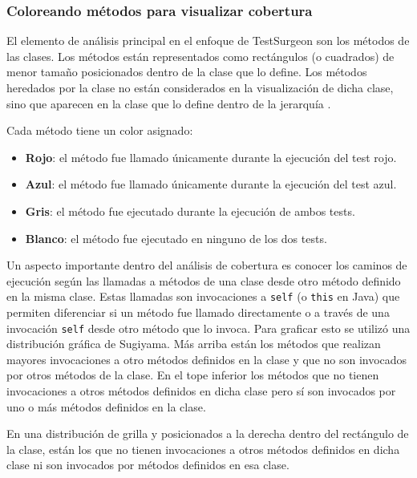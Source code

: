 
\subsubsection{Coloreando métodos para visualizar cobertura}

\par El elemento de análisis principal en el enfoque de TestSurgeon son los métodos de las clases. Los métodos están representados como rectángulos (o cuadrados) de menor tamaño posicionados dentro de la clase que lo define.  Los métodos heredados por la clase no están considerados en la visualización de dicha clase, sino que aparecen en la clase que lo define dentro de la jerarquía
.  

\par Cada método tiene un color asignado:
\begin{itemize}
\item {\bf Rojo}: el método fue llamado únicamente durante la ejecución del test rojo.
\item {\bf Azul}: el método fue llamado únicamente durante la ejecución del test azul.
\item {\bf Gris}: el método fue ejecutado durante la ejecución de ambos tests.
\item {\bf Blanco}: el método fue ejecutado en ninguno de los dos tests.
\end{itemize}

\par Un aspecto importante dentro del análisis de cobertura es conocer los caminos de ejecución según las llamadas a métodos de una clase desde otro método definido en la misma clase. Estas llamadas son invocaciones a {\tt self} (o {\tt this} en Java) que permiten diferenciar si un método fue llamado directamente o a través de una invocación {\tt self} desde otro método que lo invoca. Para graficar esto se utilizó una distribución gráfica de Sugiyama. Más arriba están los métodos que realizan mayores invocaciones a otro métodos definidos en la clase y que no son invocados por otros métodos de la clase. En el tope inferior los métodos que no tienen invocaciones a otros métodos definidos en dicha clase pero sí son invocados por uno o más métodos definidos en la clase.

\par En una distribución de grilla y posicionados a la derecha dentro del rectángulo de la clase, están los que no tienen invocaciones a otros métodos definidos en dicha clase ni son invocados por métodos definidos en esa clase.

